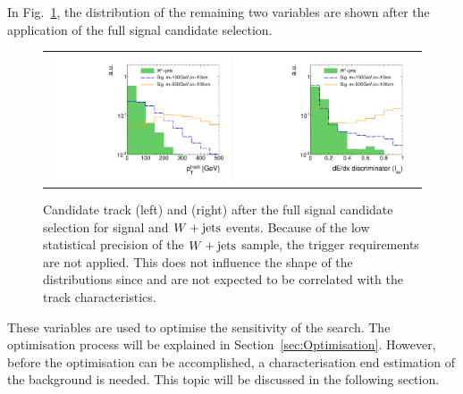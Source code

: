 In Fig.~\ref{fig:PtAndIasAfterFullPreselection}, the distribution of the remaining two variables are shown after the application of the full signal candidate selection.
\begin{figure}[!h]
  \centering 
  \begin{tabular}{c}
    \includegraphics[width=0.49\textwidth]{figures/analysis/AnalysisSelection/chiTracksfullSelectionNoTriggerCuts_Wjets/htrackPtSmallRangeCoarseBinning_log.pdf}
    \includegraphics[width=0.49\textwidth]{figures/analysis/AnalysisSelection/chiTracksfullSelectionNoTriggerCuts_Wjets/htrackASmiSmallRange_log.pdf}
  \end{tabular}
  \caption{Candidate track \pt (left) and \ias (right) after the full signal candidate selection for signal and $W+\text{jets}$ events. 
           Because of the low statistical precision of the $W+\text{jets}$ sample, the trigger requirements are not applied.
           This does not influence the shape of the distributions since \met and \ptfirstjet are not expected to be correlated with the track characteristics.}
  \label{fig:PtAndIasAfterFullPreselection}
\end{figure}
These variables are used to optimise the sensitivity of the search.
The optimisation process will be explained in Section~\ref{sec:Optimisation}.
However, before the optimisation can be accomplished, a characterisation end estimation of the background is needed.
This topic will be discussed in the following section.

